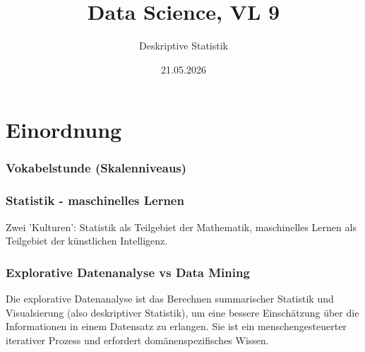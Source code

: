 

\title{Data Science, VL 9}
\subtitle{Deskriptive Statistik}
\date{21.05.2026}



\begin{frame}
  \titlepage
\end{frame}

\section{Einordnung}

\begin{frame}[separator]
  \frametitle{Vokabelstunde (Skalenniveaus)}
\end{frame}

\begin{frame}
  \frametitle{Statistik - maschinelles Lernen}

  Zwei 'Kulturen': Statistik als Teilgebiet der Mathematik, maschinelles Lernen als Teilgebiet der künstlichen Intelligenz.

\end{frame}

\begin{frame}
  \frametitle{Explorative Datenanalyse vs Data Mining}
  Die \alert{explorative Datenanalyse} ist das Berechnen summarischer Statistik und Visualsierung (also deskriptiver Statistik), um eine bessere Einschätzung über die Informationen in einem Datensatz zu erlangen. Sie ist ein menschengesteuerter iterativer Prozess und erfordert domänenspezifisches Wissen.

\vspace{0.5cm}
  
\end{frame}

